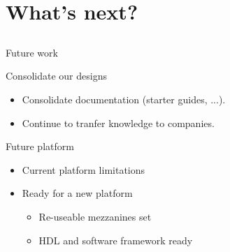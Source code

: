 \documentclass[compress,red]{beamer}
\begin{document}
\section{What's next?}

\subsection*{} %

\begin{frame}{Future work}

  \begin{block}{Consolidate our designs}
    \begin{itemize}
    \item Consolidate documentation (starter guides, ...).
    \item Continue to tranfer knowledge to companies. 
    \end{itemize}
  \end{block}

  \begin{block}{Future platform}
    \begin{itemize}
    \item Current platform limitations
    \item Ready for a new platform
      \begin{itemize}
      \item Re-useable mezzanines set
      \item HDL and software framework ready
      \end{itemize}
    \end{itemize}
  \end{block}

  \note[item]{}

\end{frame}
\end{document}
